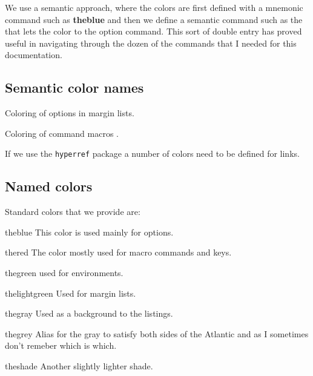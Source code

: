 We use a semantic approach, where the colors are first defined with a mnemonic command such as {\bfseries\textcolor{theblue}{theblue}} and then we define a semantic command such as the that lets the color to the option command. This sort of double entry has proved useful in navigating through the dozen of the commands that I needed for this documentation.


\subsection{Semantic color names}
\begin{marglist}
\item [\option{theoption}] Coloring of options in margin lists.
\item [\option{themacro}] Coloring of command macros .
\item [\option{hyperlink}] If we use the \texttt{hyperref} package a number of colors need to be defined for links.
\end{marglist}

\subsection{Named colors}
Standard colors that we provide are:
\begin{marglist}
\item [\textcolor{theblue}{theblue}] This color is used mainly for options.
\item [\textcolor{thered}{thered}] The color mostly used for macro commands and keys.
\item [\textcolor{thegreen}{thegreen}] used for environments.
\item [\textcolor{thelightgreen}{thelightgreen}] Used for margin lists.
\item [\textcolor{thegray}{thegray}] Used as a background to the listings.
\item [\colorbox{thegrey}{\color{white}thegrey}] Alias for the gray to satisfy both sides of the Atlantic and as I sometimes don't remeber which is which.
\item [\colorbox{theshade}{theshade}] Another slightly lighter shade.
\end{marglist}



